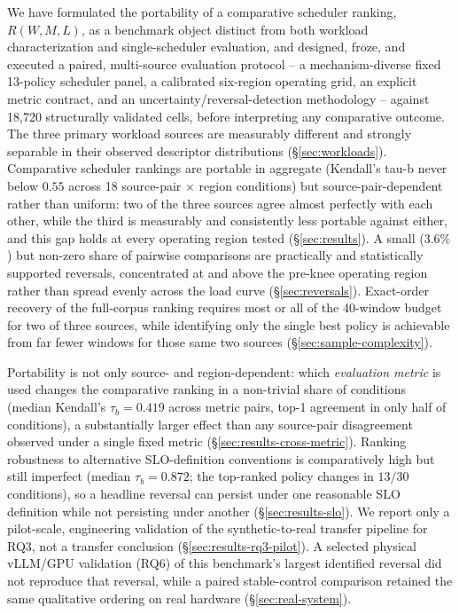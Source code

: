 \documentclass[sn-basic,Numbered,pdflatex]{sn-jnl}
\begin{document}
We have formulated the portability of a comparative scheduler ranking,
$R(W, M, L)$, as a benchmark object distinct from both workload
characterization and single-scheduler evaluation, and designed, froze, and
executed a paired, multi-source evaluation protocol -- a mechanism-diverse
fixed 13-policy scheduler panel, a calibrated six-region operating grid, an
explicit metric contract, and an uncertainty/reversal-detection
methodology -- against 18{,}720 structurally validated cells, before
interpreting any comparative outcome. The three primary workload sources
are measurably different and strongly separable in their observed
descriptor distributions (\S\ref{sec:workloads}). Comparative scheduler
rankings are portable in aggregate (Kendall's tau-b never below $0.55$
across 18 source-pair $\times$ region conditions) but source-pair-dependent
rather than uniform: two of the three sources agree almost perfectly with
each other, while the third is measurably and consistently less portable
against either, and this gap holds at every operating region tested
(\S\ref{sec:results}). A small ($3.6\%$) but non-zero share of pairwise
comparisons are practically and statistically supported reversals,
concentrated at and above the pre-knee operating region rather than spread
evenly across the load curve (\S\ref{sec:reversals}). Exact-order recovery
of the full-corpus ranking requires most or all of the 40-window budget
for two of three sources, while identifying only the single best policy is
achievable from far fewer windows for those same two sources
(\S\ref{sec:sample-complexity}).

Portability is not only source- and region-dependent: which
\emph{evaluation metric} is used changes the comparative ranking in a
non-trivial share of conditions (median Kendall's $\tau_b = 0.419$ across
metric pairs, top-1 agreement in only half of conditions), a substantially
larger effect than any source-pair disagreement observed under a single
fixed metric (\S\ref{sec:results-cross-metric}). Ranking robustness to
alternative SLO-definition conventions is comparatively high but still
imperfect (median $\tau_b = 0.872$; the top-ranked policy changes in
$13/30$ conditions), so a headline reversal can persist under one
reasonable SLO definition while not persisting under another
(\S\ref{sec:results-slo}). We report only a pilot-scale, engineering
validation of the synthetic-to-real transfer pipeline for RQ3, not a
transfer conclusion (\S\ref{sec:results-rq3-pilot}). A selected physical
vLLM/GPU validation (RQ6) of this benchmark's largest identified reversal
did not reproduce that reversal, while a paired stable-control comparison
retained the same qualitative ordering on real hardware
(\S\ref{sec:real-system}).
\end{document}
